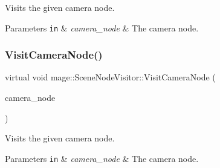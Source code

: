 Visits the given camera node.


\begin{DoxyParams}[1]{Parameters}
\mbox{\tt in}  & {\em camera\+\_\+node} & The camera node. \\
\hline
\end{DoxyParams}
\hypertarget{classmage_1_1_scene_node_visitor_a4a3bb0c3ad6253c919259efabbccfab9}{}\label{classmage_1_1_scene_node_visitor_a4a3bb0c3ad6253c919259efabbccfab9} 
\subsubsection{\texorpdfstring{Visit\+Camera\+Node()}{VisitCameraNode()}\hspace{0.1cm}{\footnotesize\ttfamily [2/2]}}
{\footnotesize\ttfamily virtual void mage\+::\+Scene\+Node\+Visitor\+::\+Visit\+Camera\+Node (\begin{DoxyParamCaption}\item[{const \hyperlink{classmage_1_1_camera_node}{Camera\+Node} \&}]{camera\+\_\+node }\end{DoxyParamCaption})\hspace{0.3cm}{\ttfamily [virtual]}}

Visits the given camera node.


\begin{DoxyParams}[1]{Parameters}
\mbox{\tt in}  & {\em camera\+\_\+node} & The camera node. \\
\hline
\end{DoxyParams}
